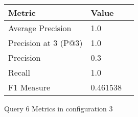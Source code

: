 \begin{figure}[H]
\begin{center}
\begin{tabular}{lll}
\toprule
{}                      Metric &         Value \\
\midrule
     Average Precision &       1.0 \\
  Precision at 3 (P@3) &       1.0 \\
             Precision &       0.3 \\
                Recall &       1.0 \\
            F1 Measure &  0.461538 \\
\bottomrule
\end{tabular}
\end{center}
\caption{Query 6 Metrics in configuration 3}
\label{fig:query_6_metrics_config_3}
\end{figure}
